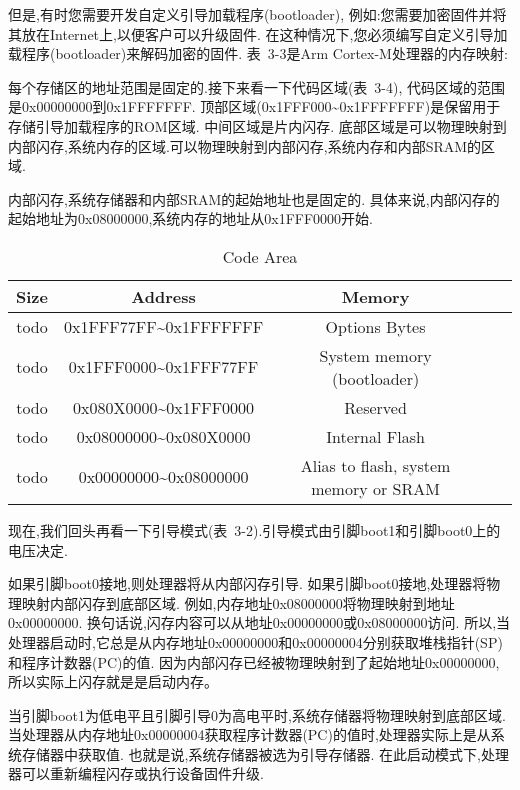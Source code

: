 但是,有时您需要开发自定义引导加载程序(bootloader),
例如:您需要加密固件并将其放在Internet上,以便客户可以升级固件.
在这种情况下,您必须编写自定义引导加载程序(bootloader)来解码加密的固件.
表~3-3是Arm Cortex-M处理器的内存映射:


每个存储区的地址范围是固定的.接下来看一下代码区域(表~3-4),
代码区域的范围是0x00000000到0x1FFFFFFF.
顶部区域(0x1FFF000\textasciitilde0x1FFFFFFF)是保留用于存储引导加载程序的ROM区域.
中间区域是片内闪存.
底部区域是可以物理映射到内部闪存,系统内存的区域.可以物理映射到内部闪存,系统内存和内部SRAM的区域.

内部闪存,系统存储器和内部SRAM的起始地址也是固定的.
具体来说,内部闪存的起始地址为0x08000000,系统内存的地址从0x1FFF0000开始.
\begin{table}[htbp]
    \caption{ Code Area }\label{tab:table1}
    \vspace{0.5em}\centering\wuhao
    \begin{tabular}{ccccc}
    \toprule[1.5pt]
    Size & Address & Memory \\
    \midrule[1pt]
    todo & 0x1FFF77FF\textasciitilde0x1FFFFFFF & Options Bytes \\
    todo & 0x1FFF0000\textasciitilde0x1FFF77FF & System memory (bootloader)\\
    todo & 0x080X0000\textasciitilde0x1FFF0000 & Reserved \\
    todo & 0x08000000\textasciitilde0x080X0000 & Internal Flash \\
    todo & 0x00000000\textasciitilde0x08000000 & Alias to flash, system memory or SRAM \\
  
    \bottomrule[1.5pt]
    \end{tabular}
    \vspace{\baselineskip}
    \end{table}

现在,我们回头再看一下引导模式(表~3-2).引导模式由引脚boot1和引脚boot0上的电压决定.

如果引脚boot0接地,则处理器将从内部闪存引导.
如果引脚boot0接地,处理器将物理映射内部闪存到底部区域.
例如,内存地址0x08000000将物理映射到地址0x00000000.
换句话说,闪存内容可以从地址0x00000000或0x08000000访问.
所以,当处理器启动时,它总是从内存地址0x00000000和0x00000004分别获取堆栈指针(SP)和程序计数器(PC)的值.
因为内部闪存已经被物理映射到了起始地址0x00000000,所以实际上闪存就是是启动内存。

当引脚boot1为低电平且引脚引导0为高电平时,系统存储器将物理映射到底部区域.
当处理器从内存地址0x00000004获取程序计数器(PC)的值时,处理器实际上是从系统存储器中获取值.
也就是说,系统存储器被选为引导存储器.
在此启动模式下,处理器可以重新编程闪存或执行设备固件升级.

